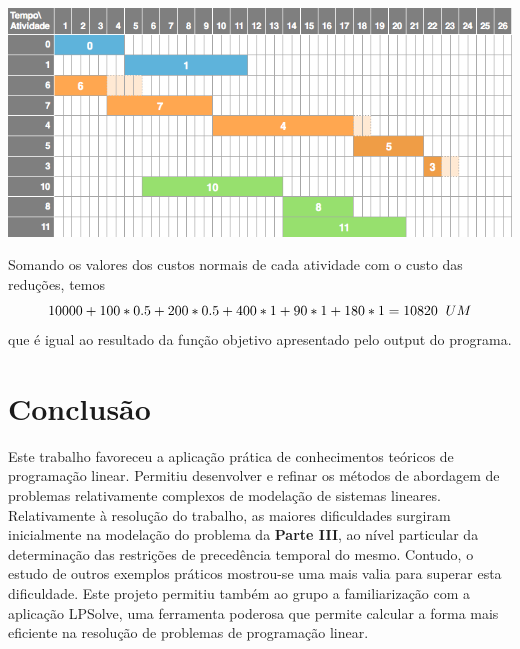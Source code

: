 \documentclass[11pt,titlepage,contentspage,a4paper]{article} %
\begin{document}
\begin{center}
\includegraphics[width=\textwidth]{gant3}
\end{center}


Somando os valores dos custos normais de cada atividade com o custo das reduções, temos $$10000 +100*0.5+200*0.5+400*1+90*1+180*1 = 10820 \hspace{0.2cm} UM $$ que é igual ao resultado da função objetivo apresentado pelo output do programa.
\section{Conclusão %
}
Este trabalho favoreceu a aplicação prática de conhecimentos teóricos de programação linear. Permitiu desenvolver e refinar os métodos de abordagem de problemas relativamente complexos de modelação de sistemas lineares.
Relativamente à resolução do trabalho, as maiores dificuldades surgiram inicialmente na modelação do problema da \textbf{Parte III}, ao nível particular da determinação das restrições de precedência temporal do mesmo. Contudo, o estudo de outros exemplos práticos mostrou-se uma mais valia para superar esta dificuldade.
Este projeto permitiu também ao grupo a familiarização com a aplicação LPSolve, uma ferramenta poderosa que permite calcular a forma mais eficiente na resolução de problemas de programação linear. 
\end{document}
